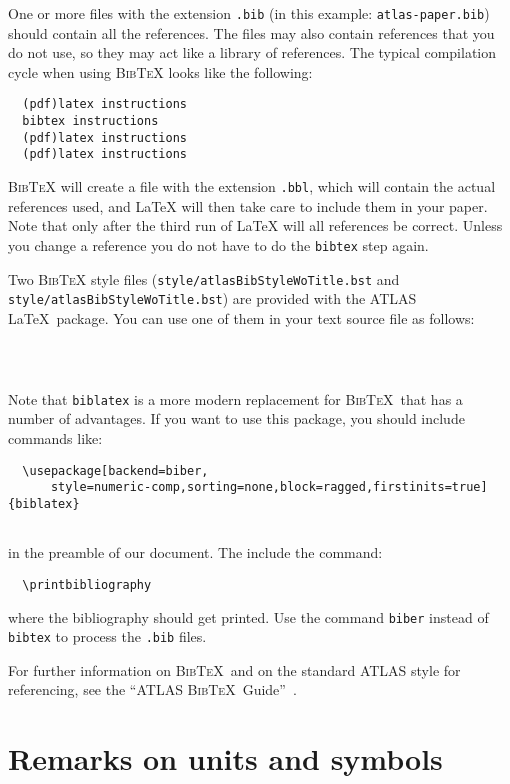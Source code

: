 \documentclass[UKenglish]{style/atlasdoc}
\newcommand{\BibTeX}{\textsc{Bib\TeX}}
\begin{document}
One or more files with the extension \texttt{.bib} 
(in this example: \texttt{atlas-paper.bib}) should contain all the references. 
The files may also contain references that you do not use, so they may act like a
library of references. 
The typical compilation cycle when using \BibTeX{} looks like the following:
%
\begin{verbatim}
  (pdf)latex instructions
  bibtex instructions
  (pdf)latex instructions
  (pdf)latex instructions
\end{verbatim}
%
\BibTeX{} will create a file with the extension \texttt{.bbl}, which will
contain the actual references used, and \LaTeX{} will then take care
to include them in your paper. Note that only after the third run of
\LaTeX{} will all references be correct. Unless you change a reference
you do not have to do the \texttt{bibtex} step again.

Two \BibTeX{} style files 
(\texttt{style/atlasBibStyleWoTitle.bst} and \texttt{style/atlasBibStyleWoTitle.bst})
are provided with the ATLAS \LaTeX\ package. 
You can use one of them in your text source file as follows:
%
\begin{verbatim}
  
  
\end{verbatim}

Note that \texttt{biblatex} is a more modern replacement for \BibTeX\ that has a number of advantages.
If you want to use this package, you should include commands like:
%
\begin{verbatim}
  \usepackage[backend=biber,
	  style=numeric-comp,sorting=none,block=ragged,firstinits=true]{biblatex}
  
\end{verbatim}
%
in the preamble of our document.
The include the command:
%
\begin{verbatim}
  \printbibliography
\end{verbatim}
%
where the bibliography should get printed.
Use the command \texttt{biber} instead of \texttt{bibtex} to process the \texttt{.bib} files.

For further information on \BibTeX\ and on the standard ATLAS style for referencing, 
see the ``ATLAS \BibTeX\ Guide''~\cite{atlas-bibtex}.


\section{Remarks on units and symbols}
\label{sec:units}
\end{document}
